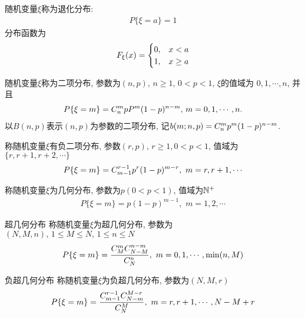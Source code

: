 \begin{degrade_distru}[退化分布]
随机变量\(\xi\)称为退化分布:
\begin{align}
P\{\xi = a\} = 1
\end{align}
分布函数为
\begin{align}
F_{\xi}(x) = \begin{cases} 0, & x<a\cr 1, & x\ge a\cr\end{cases}
\end{align}
\end{degrade_distru}

\begin{binomial_distru}[二项分布]
随机变量\(\xi\)称为二项分布, 参数为\((n, p),\, n\ge 1,\, 0<p<1\), \(\xi\)的值域为 \(0, 1, \cdots, n\), 并且
\begin{align}
P\{\xi = m\} = C_{n}^{m}pP^{m}(1-p)^{n-m},\, m = 0,1,\cdots, n.
\end{align}
以\(B(n, p)\)表示\((n,p)\)为参数的二项分布, 记\(b(m;n, p) = C_{n}^{m}p^{m}(1-p)^{n-m}\).
\end{binomial_distru}

\begin{negative_binomial_distru}[负二项分布]
称随机变量\(\xi\)有负二项分布, 参数\((r, p),\,r\ge 1, 0<p<1\), 值域为\(\{r, r+1, r+2, \cdots\}\)
\begin{align}
P\{\xi = m\} = C_{m-1}^{r-1}p^{r}(1-p)^{m-r},\,\, m = r, r+1, \cdots
\end{align}
\end{negative_binomial_distru}

\begin{geometry_distru}[几何分布]
称随机变量\(\xi\)为几何分布, 参数为\(p(0<p<1)\), 值域为\(\Ns^+\)
\begin{align}
P\{\xi = m\} = p(1-p)^{m-1},\,\, m = 1, 2, \cdots
\end{align}
\end{geometry_distru}

\begin{super_geometry_distru}{超几何分布}
称随机变量\(\xi\)为超几何分布, 参数为\((N, M, n),\,1\le M\le N,\,1\le n\le N\)
\begin{align}
P\{\xi = m\} = {C_{M}^{m}C_{N-M}^{n-m}\over C_{N}^{n}},\,\, m =0, 1, \cdots, \min(n, M)
\end{align}
\end{super_geometry_distru}

\begin{negative_super_geometry_distru}{负超几何分布}
称随机变量\(\xi\)为负超几何分布, 参数为\((N, M, r)\)
\begin{align}
P\{\xi = m\} = {C_{m-1}^{r-1}C_{N-m}^{M-r}\over C_{N}^{M}},\,\, m =r, r+1, \cdots, N-M+r
\end{align}
\end{negative_super_geometry_distru}

